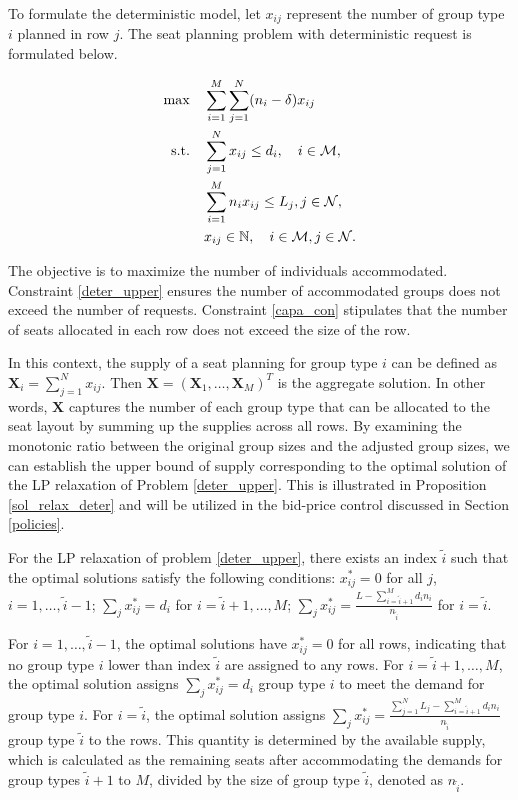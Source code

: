 To formulate the deterministic model, let $x_{ij}$ represent the number of group type $i$ planned in row $j$. The seat planning problem with deterministic request is formulated below.

\begin{align}
\max \quad & \sum_{i=1}^{M}  \sum_{j= 1}^{N} (n_i- \delta) x_{ij} \notag \\
\text {s.t.} \quad & \sum_{j= 1}^{N} x_{ij} \leq d_{i}, \quad i \in \mathcal{M}, \label{deter_upper}\\ 
& \sum_{i=1}^{M} n_{i} x_{ij} \leq L_j, j \in \mathcal{N}, \label{capa_con} \\
& x_{ij} \in \mathbb{N}, \quad i \in \mathcal{M}, j \in \mathcal{N}. \notag 
\end{align}

The objective is to maximize the number of individuals accommodated. Constraint \eqref{deter_upper} ensures the number of accommodated groups does not exceed the number of requests. Constraint \eqref{capa_con} stipulates that the number of seats allocated in each row does not exceed the size of the row.

In this context, the supply of a seat planning for group type $i$ can be defined as $\bm{X}_i= \sum_{j=1}^{N} x_{ij}$. Then $\bm{X} = (\bm{X}_{1}, \ldots, \bm{X}_{M})^T$ is the aggregate solution. In other words, $\bm{X}$ captures the number of each group type that can be allocated to the seat layout by summing up the supplies across all rows. By examining the monotonic ratio between the original group sizes and the adjusted group sizes, we can establish the upper bound of supply corresponding to the optimal solution of the LP relaxation of Problem \eqref{deter_upper}. This is illustrated in Proposition \ref{sol_relax_deter} and will be utilized in the bid-price control discussed in Section \ref{policies}.

\begin{prop}\label{sol_relax_deter}
For the LP relaxation of problem \eqref{deter_upper}, there exists an index $\tilde{i}$ such that the optimal solutions satisfy the following conditions: $x_{ij}^{*} = 0$ for all $j$, $i = 1,\ldots, \tilde{i}-1$; $\sum_{j} x_{ij}^{*} = d_{i}$ for $i = \tilde{i}+1,\ldots, M$; $\sum_{j} x_{ij}^{*} = \frac{L - \sum_{i = \tilde{i}+1}^{M} {d_i n_i}}{n_{\tilde{i}}}$ for $i = \tilde{i}$.
\end{prop}

For $i = 1,\ldots, \tilde{i}-1$, the optimal solutions have $x_{ij}^{*} = 0$ for all rows, indicating that no group type $i$ lower than index $\tilde{i}$ are assigned to any rows. For $i = \tilde{i}+1,\ldots, M$, the optimal solution assigns $\sum_{j} x_{ij}^{*} = d_{i}$ group type $i$ to meet the demand for group type $i$. For $i = \tilde{i}$, the optimal solution assigns $\sum_{j} x_{ij}^{*} = \frac{\sum_{j=1}^{N}L_{j} - \sum_{i = \tilde{i}+1}^{M} {d_i n_i}}{n_{\tilde{i}}}$ group type $\tilde{i}$ to the rows. This quantity is determined by the available supply, which is calculated as the remaining seats after accommodating the demands for group types $\tilde{i}+1$ to $M$, divided by the size of group type $\tilde{i}$, denoted as $n_{\tilde{i}}$.

